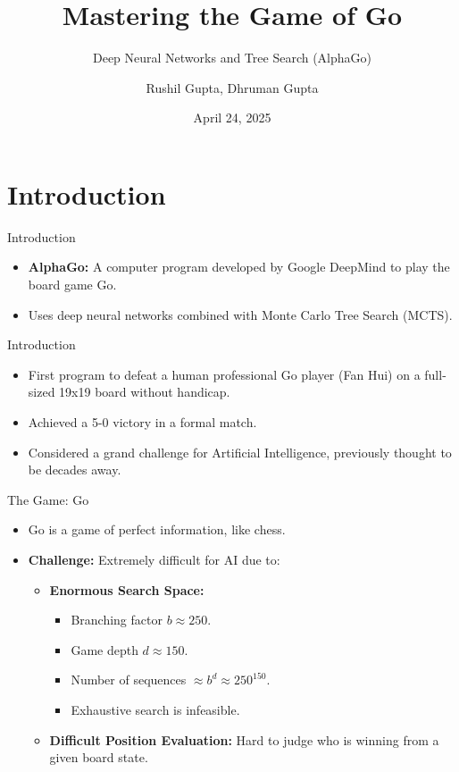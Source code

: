 \documentclass{beamer}
\title{Mastering the Game of Go}
\subtitle{Deep Neural Networks and Tree Search (AlphaGo)}
\author{Rushil Gupta, Dhruman Gupta}
\date{April 24, 2025}
\begin{document}
\frame{\titlepage}



\section{Introduction}
\begin{frame}{Introduction}
    \begin{itemize}
        \item \textbf{AlphaGo:} A computer program developed by Google DeepMind to play the board game Go.
        \item Uses deep neural networks combined with Monte Carlo Tree Search (MCTS).
    \end{itemize}
\end{frame}

\begin{frame}{Introduction}
    \begin{itemize}
        \item First program to defeat a human professional Go player (Fan Hui) on a full-sized 19x19 board without handicap.
        \item Achieved a 5-0 victory in a formal match.
        \item Considered a grand challenge for Artificial Intelligence, previously thought to be decades away.
    \end{itemize}
\end{frame}

\begin{frame}{The Game: Go}
    \begin{itemize}
        \item Go is a game of perfect information, like chess.
        \item \textbf{Challenge:} Extremely difficult for AI due to:
        \vspace{2ex}
            \begin{itemize}
                \item \textbf{Enormous Search Space:}
                \begin{itemize}
                    \item Branching factor $b \approx 250$.
                    \item Game depth $d \approx 150$.
                    \item Number of sequences $\approx b^d \approx 250^{150}$.
                    \item Exhaustive search is infeasible.
                \end{itemize}
                \item \textbf{Difficult Position Evaluation:} Hard to judge who is winning from a given board state.
            \end{itemize}
    \end{itemize}
\end{frame}
\end{document}
